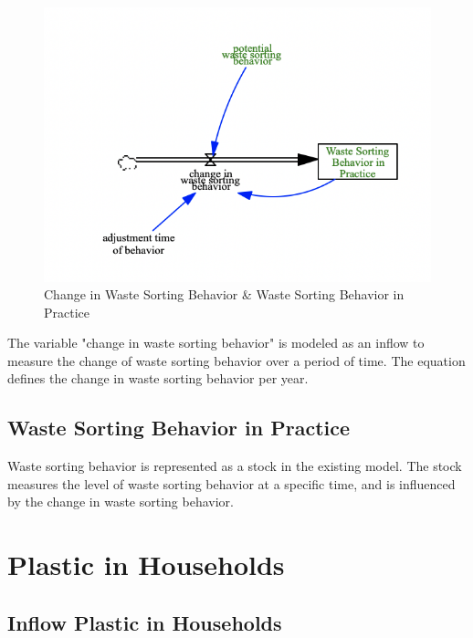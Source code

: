 \begin{figure}[H]
\centering
\includegraphics [scale=0.34,angle=360]{figures/changebehaviour.png}
\caption{Change in Waste Sorting Behavior \& Waste Sorting Behavior in Practice}
\label{fig:changebehaviour}
\end{figure}

\indent \newline
The variable "change in waste sorting behavior" is modeled as an inflow to measure the change of waste sorting behavior over a period of time. The equation defines the change in waste sorting behavior per year. 

\subsection{Waste Sorting Behavior in Practice}

\indent \newline
Waste sorting behavior is represented as a stock in the existing model. The stock measures the level of waste sorting behavior at a specific time, and is influenced by the change in waste sorting behavior.

\section{Plastic in Households}

\subsection{Inflow Plastic in Households}

